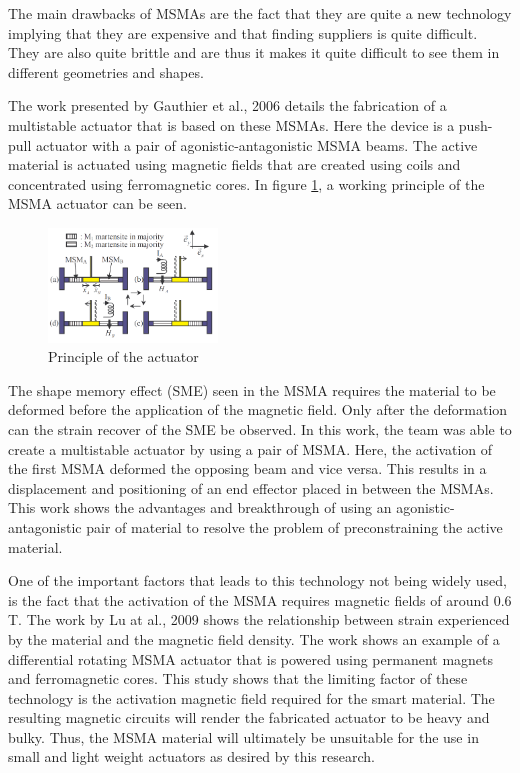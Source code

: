 The main drawbacks of MSMAs are the fact that they are quite a new technology implying that they are expensive and that finding suppliers is quite difficult. They are also quite brittle and are thus it makes it quite difficult to see them in different geometries and shapes.

The work presented by Gauthier et al., 2006\cite{gauthier_multistable_2006} details the fabrication of a multistable actuator that is based on these MSMAs. Here the device is a push-pull actuator with a pair of agonistic-antagonistic MSMA beams. The active material is actuated using magnetic fields that are created using coils and concentrated using ferromagnetic cores. In figure \ref{fig:MSMA_princ}, a working principle of the MSMA actuator can be seen.
\begin{figure}[H]
	\centering
	\includegraphics[width=0.4\textwidth]{Figures/MSMA_princ.png}
	\caption{Principle of the actuator\cite{gauthier_multistable_2006}}
	\label{fig:MSMA_princ}
\end{figure}

The shape memory effect (SME) seen in the MSMA requires the material to be deformed before the application of the magnetic field. Only after the deformation can the strain recover of the SME be observed. In this work, the team was able to create a multistable actuator by using a pair of MSMA. Here, the activation of the first MSMA deformed the opposing beam and vice versa. This results in a displacement and positioning of an end effector placed in between the MSMAs. This work shows the advantages and breakthrough of using an agonistic-antagonistic pair of material to resolve the problem of preconstraining the active material.

One of the important factors that leads to this technology not being widely used, is the fact that the activation of the MSMA requires magnetic fields of around 0.6 T. The work by Lu at al., 2009\cite{lu_optimal_2009} shows the relationship between strain experienced by the material and the magnetic field density. The work shows an example of a differential rotating MSMA actuator that is powered using permanent magnets and ferromagnetic cores. This study shows that the limiting factor of these technology is the activation magnetic field required for the smart material. The resulting magnetic circuits will render the fabricated actuator to be heavy and bulky. Thus, the MSMA material will ultimately be unsuitable for the use in small and light weight actuators as desired by this research.

